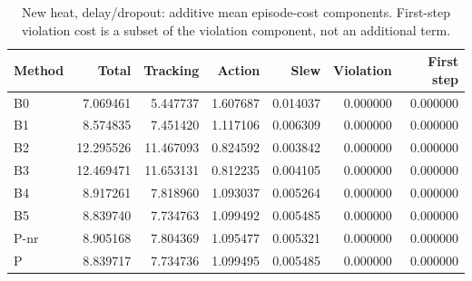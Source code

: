 \begin{table}[ht]
\centering\small
\caption{New heat, delay/dropout: additive mean episode-cost components. First-step violation cost is a subset of the violation component, not an additional term.}\label{tab:new_heat_costparts_locked_delay_dropout}
\begin{tabular}{@{}lrrrrrr@{}}\toprule
Method & Total & Tracking & Action & Slew & Violation & First step\\\midrule
B0 & 7.069461 & 5.447737 & 1.607687 & 0.014037 & 0.000000 & 0.000000\\
B1 & 8.574835 & 7.451420 & 1.117106 & 0.006309 & 0.000000 & 0.000000\\
B2 & 12.295526 & 11.467093 & 0.824592 & 0.003842 & 0.000000 & 0.000000\\
B3 & 12.469471 & 11.653131 & 0.812235 & 0.004105 & 0.000000 & 0.000000\\
B4 & 8.917261 & 7.818960 & 1.093037 & 0.005264 & 0.000000 & 0.000000\\
B5 & 8.839740 & 7.734763 & 1.099492 & 0.005485 & 0.000000 & 0.000000\\
P-nr & 8.905168 & 7.804369 & 1.095477 & 0.005321 & 0.000000 & 0.000000\\
P & 8.839717 & 7.734736 & 1.099495 & 0.005485 & 0.000000 & 0.000000\\
\bottomrule\end{tabular}
\end{table}
